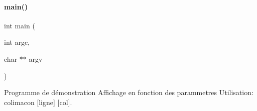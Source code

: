 \paragraph{\texorpdfstring{main()}{main()}}
{\footnotesize\ttfamily int main (\begin{DoxyParamCaption}\item[{int}]{argc,  }\item[{char $\ast$$\ast$}]{argv }\end{DoxyParamCaption})}



Programme de démonstration Affichage en fonction des parammetres Utilisation\+: colimacon \mbox{[}ligne\mbox{]} \mbox{[}col\mbox{]}. 

